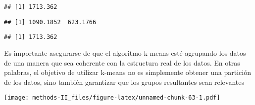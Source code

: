 \documentclass[
]{article}
\newenvironment{Shaded}{\begin{snugshade}}{\end{snugshade}}
\newcommand{\AttributeTok}[1]{\textcolor[rgb]{0.77,0.63,0.00}{#1}}
\newcommand{\DecValTok}[1]{\textcolor[rgb]{0.00,0.00,0.81}{#1}}
\newcommand{\FunctionTok}[1]{\textcolor[rgb]{0.00,0.00,0.00}{#1}}
\newcommand{\NormalTok}[1]{#1}
\newcommand{\SpecialCharTok}[1]{\textcolor[rgb]{0.00,0.00,0.00}{#1}}
\begin{document}
\begin{Shaded}
\end{Shaded}

\begin{verbatim}
## [1] 1713.362
\end{verbatim}

\begin{Shaded}
\end{Shaded}

\begin{verbatim}
## [1] 1090.1852  623.1766
\end{verbatim}

\begin{Shaded}
\end{Shaded}

\begin{verbatim}
## [1] 1713.362
\end{verbatim}

Es importante asegurarse de que el algoritmo k-means esté agrupando los
datos de una manera que sea coherente con la estructura real de los
datos. En otras palabras, el objetivo de utilizar k-means no es
simplemente obtener una partición de los datos, sino también garantizar
que los grupos resultantes sean relevantes

\begin{Shaded}
\end{Shaded}

\texttt{[image: methods-II\_files/figure-latex/unnamed-chunk-63-1.pdf]}
\end{document}
